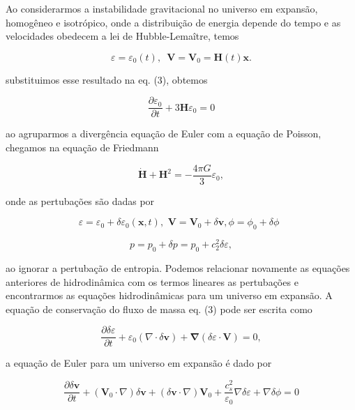 Ao considerarmos a instabilidade gravitacional no universo em expansão, homogêneo e isotrópico, onde a distribuição de energia depende do tempo e as velocidades obedecem a lei de Hubble-Lemaître, temos

\begin{equation}\label{eq20}
	\varepsilon = \varepsilon_0 (t), \,\,\, \mathbf{V} = \mathbf{V}_0 = \mathbf{H} (t) \mathbf{x}.
\end{equation}
 
 substituimos esse resultado na eq. (3), obtemos
 
\begin{equation}\label{eq21}
	\dfrac{\partial \varepsilon_0}{\partial t}  + 3 \mathbf{H}\varepsilon_0 = 0 
\end{equation} 

ao agruparmos a divergência equação de Euler com a equação de Poisson, chegamos na equação de Friedmann

\begin{equation}\label{eq22}
	\dot{\mathbf{H}} + \mathbf{H}^2 = - \dfrac{4\pi G}{3}\varepsilon_0,
\end{equation}

onde as pertubações são dadas por

\begin{equation}\label{eq23}
	\varepsilon = \varepsilon_0 + \delta\varepsilon_0 (\mathbf{x},t),\,\, \mathbf{V} = \mathbf{V}_0 + \delta\mathbf{v} , \phi= \phi_0 + \delta\phi\,\,\, 
\end{equation}

$$p = p_0 + \delta p= p_0 + c_2^2\delta\varepsilon ,$$

ao ignorar a pertubação de entropia. Podemos relacionar novamente as equações anteriores de hidrodinâmica com os termos lineares as pertubações e encontrarmos as equações hidrodinâmicas para um universo em expansão. A equação de conservação do fluxo de massa eq. (3) pode ser escrita como 

\begin{equation}\label{eq24}
	\dfrac{\partial\delta\varepsilon}{\partial t} + \varepsilon_0(\nabla\cdot\delta\mathbf{v})+\mathbf{\nabla} (\delta\varepsilon \cdot \mathbf{V}) = 0,
\end{equation}

a equação de Euler para um universo em expansão é dado por

\begin{equation}\label{eq25}
	\dfrac{\partial\delta\mathbf{v}}{\partial t} + (\mathbf{V}_0 \cdot \nabla)\delta\mathbf{v} + (\delta\mathbf{v} \cdot \nabla) \mathbf{V}_0 + \dfrac{c^2_s}{\varepsilon_0}\nabla\delta\varepsilon + \nabla\delta\phi = 0
\end{equation}

